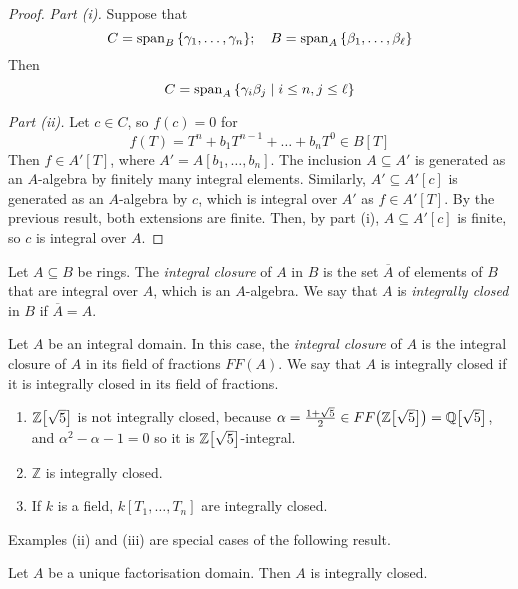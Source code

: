 \begin{proof}
    \emph{Part (i).}
    Suppose that
    \[ C = \operatorname{span}_B\qty{\gamma_1, \dots, \gamma_n};\quad B = \operatorname{span}_A\qty{\beta_1, \dots, \beta_\ell} \]
    Then
    \[ C = \operatorname{span}_A\qty{\gamma_i \beta_j \mid i \leq n, j \leq \ell} \]

    \emph{Part (ii).}
    Let \( c \in C \), so \( f(c) = 0 \) for
    \[ f(T) = T^n + b_1 T^{n-1} + \dots + b_n T^0 \in B[T] \]
    Then \( f \in A'[T] \), where \( A' = A[b_1, \dots, b_n] \).
    The inclusion \( A \subseteq A' \) is generated as an \( A \)-algebra by finitely many integral elements.
    Similarly, \( A' \subseteq A'[c] \) is generated as an \( A \)-algebra by \( c \), which is integral over \( A' \) as \( f \in A'[T] \).
    By the previous result, both extensions are finite.
    Then, by part (i), \( A \subseteq A'[c] \) is finite, so \( c \) is integral over \( A \).
\end{proof}
\begin{definition}
    Let \( A \subseteq B \) be rings.
    The \emph{integral closure} of \( A \) in \( B \) is the set \( \overline A \) of elements of \( B \) that are integral over \( A \), which is an \( A \)-algebra.
    We say that \( A \) is \emph{integrally closed} in \( B \) if \( \overline A = A \).
\end{definition}
\begin{definition}
    Let \( A \) be an integral domain.
    In this case, the \emph{integral closure} of \( A \) is the integral closure of \( A \) in its field of fractions \( FF(A) \).
    We say that \( A \) is integrally closed if it is integrally closed in its field of fractions.
\end{definition}
\begin{example}
    \begin{enumerate}
        \item \( \mathbb Z\qty[\sqrt{5}] \) is not integrally closed, because \( \alpha = \frac{1 + \sqrt{5}}{2} \in FF\qty(\mathbb Z\qty[\sqrt{5}]) = \mathbb Q\qty[\sqrt{5}] \), and \( \alpha^2 - \alpha - 1 = 0 \) so it is \( \mathbb Z\qty[\sqrt{5}] \)-integral.
        \item \( \mathbb Z \) is integrally closed.
        \item If \( k \) is a field, \( k[T_1, \dots, T_n] \) are integrally closed.
    \end{enumerate}
\end{example}
Examples (ii) and (iii) are special cases of the following result.
\begin{proposition}
    Let \( A \) be a unique factorisation domain.
    Then \( A \) is integrally closed.
\end{proposition}
